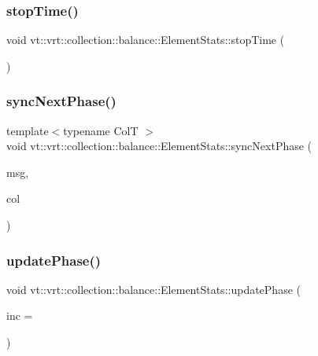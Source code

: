\subsubsection{\texorpdfstring{stop\+Time()}{stopTime()}}
{\footnotesize\ttfamily void vt\+::vrt\+::collection\+::balance\+::\+Element\+Stats\+::stop\+Time (\begin{DoxyParamCaption}{ }\end{DoxyParamCaption})}

\mbox{\label{structvt_1_1vrt_1_1collection_1_1balance_1_1_element_stats_ae9425ce57397a368d58db9883b996939}} 
\subsubsection{\texorpdfstring{sync\+Next\+Phase()}{syncNextPhase()}}
{\footnotesize\ttfamily template$<$typename ColT $>$ \\
void vt\+::vrt\+::collection\+::balance\+::\+Element\+Stats\+::sync\+Next\+Phase (\begin{DoxyParamCaption}\item[{\hyperlink{structvt_1_1vrt_1_1collection_1_1balance_1_1_collect_stats_msg}{Collect\+Stats\+Msg}$<$ ColT $>$ $\ast$}]{msg,  }\item[{ColT $\ast$}]{col }\end{DoxyParamCaption})\hspace{0.3cm}{\ttfamily [static]}}

\mbox{\label{structvt_1_1vrt_1_1collection_1_1balance_1_1_element_stats_a6ba8726a871702870d76dca6de298d07}} 
\subsubsection{\texorpdfstring{update\+Phase()}{updatePhase()}}
{\footnotesize\ttfamily void vt\+::vrt\+::collection\+::balance\+::\+Element\+Stats\+::update\+Phase (\begin{DoxyParamCaption}\item[{\hyperlink{namespacevt_a46ce6733d5cdbd735d561b7b4029f6d7}{Phase\+Type} const \&}]{inc = {} }\end{DoxyParamCaption})}



